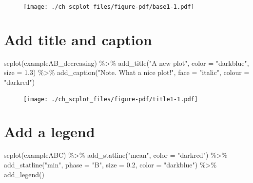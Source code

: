 \documentclass[
  letterpaper,
  DIV=11,
  numbers=noendperiod]{scrreprt}
\newenvironment{Shaded}{\begin{snugshade}}{\end{snugshade}}
\newcommand{\AttributeTok}[1]{\textcolor[rgb]{0.40,0.45,0.13}{#1}}
\newcommand{\FloatTok}[1]{\textcolor[rgb]{0.68,0.00,0.00}{#1}}
\newcommand{\FunctionTok}[1]{\textcolor[rgb]{0.28,0.35,0.67}{#1}}
\newcommand{\NormalTok}[1]{\textcolor[rgb]{0.00,0.23,0.31}{#1}}
\newcommand{\SpecialCharTok}[1]{\textcolor[rgb]{0.37,0.37,0.37}{#1}}
\newcommand{\StringTok}[1]{\textcolor[rgb]{0.13,0.47,0.30}{#1}}
\begin{document}
\begin{figure}[H]

{\centering \texttt{[image: ./ch\_scplot\_files/figure-pdf/base1-1.pdf]}

}

\end{figure}

\hypertarget{add-title-and-caption}{%
\section{Add title and caption}\label{add-title-and-caption}}

\begin{Shaded}
\begin{Highlighting}[]
\FunctionTok{scplot}\NormalTok{(exampleAB\_decreasing) }\SpecialCharTok{\%\textgreater{}\%}
  \FunctionTok{add\_title}\NormalTok{(}\StringTok{"A new plot"}\NormalTok{, }\AttributeTok{color =} \StringTok{"darkblue"}\NormalTok{, }\AttributeTok{size =} \FloatTok{1.3}\NormalTok{) }\SpecialCharTok{\%\textgreater{}\%}
  \FunctionTok{add\_caption}\NormalTok{(}\StringTok{"Note. What a nice plot!"}\NormalTok{, }\AttributeTok{face =} \StringTok{"italic"}\NormalTok{, }\AttributeTok{colour =} \StringTok{"darkred"}\NormalTok{)}
\end{Highlighting}
\end{Shaded}

\begin{figure}[H]

{\centering \texttt{[image: ./ch\_scplot\_files/figure-pdf/title1-1.pdf]}

}

\end{figure}

\hypertarget{add-a-legend}{%
\section{Add a legend}\label{add-a-legend}}

\begin{Shaded}
\begin{Highlighting}[]
\FunctionTok{scplot}\NormalTok{(exampleABC) }\SpecialCharTok{\%\textgreater{}\%}
  \FunctionTok{add\_statline}\NormalTok{(}\StringTok{"mean"}\NormalTok{, }\AttributeTok{color =} \StringTok{"darkred"}\NormalTok{) }\SpecialCharTok{\%\textgreater{}\%}
  \FunctionTok{add\_statline}\NormalTok{(}\StringTok{"min"}\NormalTok{, }\AttributeTok{phase =} \StringTok{"B"}\NormalTok{, }\AttributeTok{size =} \FloatTok{0.2}\NormalTok{, }\AttributeTok{color =} \StringTok{"darkblue"}\NormalTok{) }\SpecialCharTok{\%\textgreater{}\%}
  \FunctionTok{add\_legend}\NormalTok{()}
\end{Highlighting}
\end{Shaded}
\end{document}

